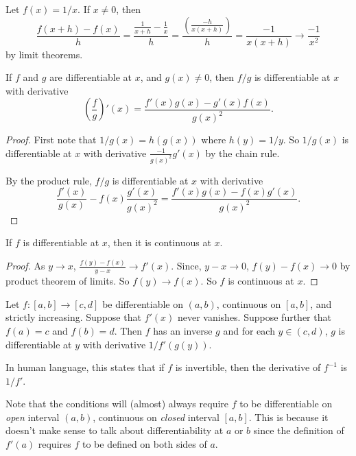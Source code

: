 \documentclass[a4paper]{article}
\begin{document}
\begin{eg}
  Let $f(x) = 1/x$. If $x\not = 0$, then
  \[
    \frac{f(x + h) - f(x)}{h} = \frac{\frac{1}{x + h} - \frac{1}{x}}{h} = \frac{\left(\frac{-h}{x(x + h)}\right)}{h} = \frac{-1}{x(x + h)} \to \frac{-1}{x^2}
  \]
  by limit theorems.
\end{eg}

\begin{lemma}
  If $f$ and $g$ are differentiable at $x$, and $g(x) \not = 0$, then $f/g$ is differentiable at $x$ with derivative
  \[
    \left(\frac{f}{g}\right)'(x) = \frac{f'(x)g(x) - g'(x)f(x)}{g(x)^2}.
  \]
\end{lemma}

\begin{proof}
  First note that $1/g(x) = h(g(x))$ where $h(y) = 1/y$. So $1/g(x)$ is differentiable at $x$ with derivative $\displaystyle \frac{-1}{g(x)^2}g'(x)$ by the chain rule.

  By the product rule, $f/g$ is differentiable at $x$ with derivative
  \[
    \frac{f'(x)}{g(x)} - f(x)\frac{g'(x)}{g(x)^2} = \frac{f'(x)g(x) - f(x)g'(x)}{g(x)^2}.
  \]
\end{proof}
\begin{lemma}
  If $f$ is differentiable at $x$, then it is continuous at $x$.
\end{lemma}

\begin{proof}
  As $y\to x$, $\displaystyle \frac{f(y) - f(x)}{y - x} \to f'(x)$. Since, $y - x \to 0$, $f(y) - f(x) \to 0$ by product theorem of limits. So $f(y) \to f(x)$. So $f$ is continuous at $x$.
\end{proof}

\begin{thm}
  Let $f:[a, b]\to [c, d]$ be differentiable on $(a, b)$, continuous on $[a, b]$, and strictly increasing. Suppose that $f'(x)$ never vanishes. Suppose further that $f(a) = c$ and $f(b) = d$. Then $f$ has an inverse $g$ and for each $y\in (c, d)$, $g$ is differentiable at $y$ with derivative $1/f'(g(y))$.

  In human language, this states that if $f$ is invertible, then the derivative of $f^{-1}$ is $1/f'$.
\end{thm}
Note that the conditions will (almost) always require $f$ to be differentiable on \emph{open} interval $(a, b)$, continuous on \emph{closed} interval $[a, b]$. This is because it doesn't make sense to talk about differentiability at $a$ or $b$ since the definition of $f'(a)$ requires $f$ to be defined on both sides of $a$.
\end{document}
